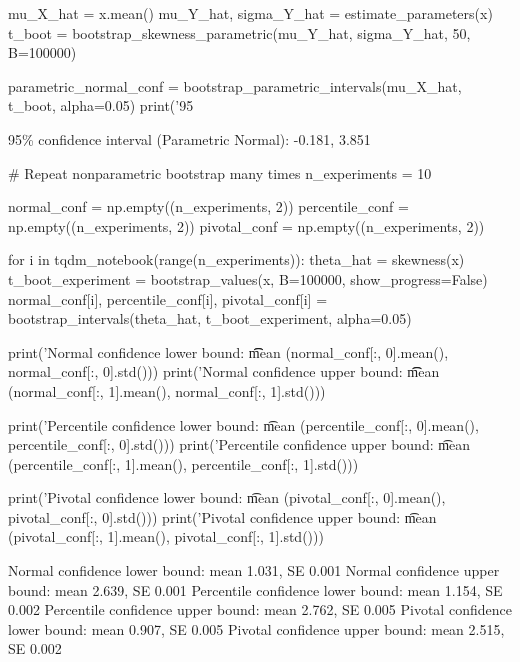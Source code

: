\begin{python}
mu_X_hat = x.mean()
mu_Y_hat, sigma_Y_hat = estimate_parameters(x)
t_boot = bootstrap_skewness_parametric(mu_Y_hat, sigma_Y_hat, 50, B=100000)

parametric_normal_conf = bootstrap_parametric_intervals(mu_X_hat, t_boot, alpha=0.05)
print('95%
\end{python}

\begin{console}
95\% confidence interval (Parametric Normal):     -0.181, 3.851
\end{console}

\begin{python}
# Repeat nonparametric bootstrap many times
n_experiments = 10

normal_conf = np.empty((n_experiments, 2))
percentile_conf = np.empty((n_experiments, 2))
pivotal_conf = np.empty((n_experiments, 2))

for i in tqdm_notebook(range(n_experiments)):
    theta_hat = skewness(x)
    t_boot_experiment = bootstrap_values(x, B=100000, show_progress=False)
    normal_conf[i], percentile_conf[i], pivotal_conf[i] = bootstrap_intervals(theta_hat, t_boot_experiment, alpha=0.05)
\end{python}

\begin{python}
print('Normal confidence lower bound: \t\t mean %
      (normal_conf[:, 0].mean(), normal_conf[:, 0].std()))
print('Normal confidence upper bound: \t\t mean %
      (normal_conf[:, 1].mean(), normal_conf[:, 1].std()))

print('Percentile confidence lower bound: \t mean %
      (percentile_conf[:, 0].mean(), percentile_conf[:, 0].std()))
print('Percentile confidence upper bound: \t mean %
      (percentile_conf[:, 1].mean(), percentile_conf[:, 1].std()))

print('Pivotal confidence lower bound: \t mean %
      (pivotal_conf[:, 0].mean(), pivotal_conf[:, 0].std()))
print('Pivotal confidence upper bound: \t mean %
      (pivotal_conf[:, 1].mean(), pivotal_conf[:, 1].std()))
\end{python}

\begin{console}
Normal confidence lower bound:           mean 1.031, SE 0.001
Normal confidence upper bound:           mean 2.639, SE 0.001
Percentile confidence lower bound:       mean 1.154, SE 0.002
Percentile confidence upper bound:       mean 2.762, SE 0.005
Pivotal confidence lower bound:          mean 0.907, SE 0.005
Pivotal confidence upper bound:          mean 2.515, SE 0.002
\end{console}


